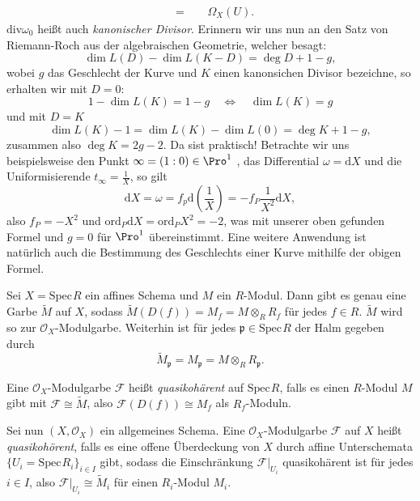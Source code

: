 \documentclass[11pt]{book}
\theoremstyle{nonumberbreak}
\newenvironment{ex}[1][]{\ifthenelse{\equal{#1}{}}{\example}{\example[#1]}\rm}{\endexample}
\newenvironment{definbem}[1][]{\ifthenelse{\equal{#1}{}}{\definibem}{\definibem[#1]}\rm}{\enddefinibem}
\newcommand{\spec}{\mathrm{Spec} \hspace{1pt} }
\newcommand{\p}{\mathfrak{p}}
\begin{document}
\begin{spacing}{1.4}
\begin{ex}
\begin{compactenum}
\begin{alignat*}{5}
&=&& \ \ \Omega_X(U).
\end{alignat*}
$\text{div} \omega_0$ heißt auch \textit{kanonischer Divisor}. Erinnern wir uns nun an den Satz von Riemann-Roch aus der algebraischen Geometrie, welcher besagt:
$$\dim L(D) - \dim L(K-D) = \deg D +1 - g,$$
wobei $g$ das Geschlecht der Kurve und $K$ einen kanonsichen Divisor bezeichne, so erhalten wir mit $D=0$:
$$1- \dim L(K) = 1-g \quad \Longleftrightarrow \quad \dim L(K) = g$$
und mit $D=K$
$$\dim L(K)-1 = \dim L(K) - \dim L(0) = \deg K +1 - g,$$
zusammen also
$\deg K = 2g-2$. Da sist praktisch! Betrachte wir uns beispielsweise den Punkt $\infty = (1:0) \in \Pro^1$ , das Differential $\omega = \mathrm{d}X$ und die Uniformisierende $t_{\infty} = \frac{1}{X}$, so gilt 
$$ \text{d}X =\omega= f_p \text{d}\left( \frac{1}{X}\right) = -f_P \frac{1}{X^2} \text{d}X,$$
also $f_P= -X^2$ und $\text{ord}_P \text{d}X = \text{ord}_P X^2 = -2$, was mit unserer oben gefunden Formel und $g=0$ für $\Pro^1$ übereinstimmt. Eine weitere Anwendung ist natürlich auch die Bestimmung des Geschlechts einer Kurve mithilfe der obigen Formel.

\end{compactenum}
\end{ex}


\begin{definbem}    %

\begin{compactenum}
\item Sei $X = \spec R$ ein affines Schema und $M$ ein $R$-Modul. Dann gibt es genau eine Garbe $\tilde{M}$ auf $X$, sodass $\tilde{M}(D(f)) = M_f = M \otimes_R R_f$ für jedes $f \in R$. $\tilde{M}$ wird so zur $\mathcal{O}_X$-Modulgarbe. Weiterhin ist für jedes $\p \in \spec R$ der Halm gegeben durch 
$$\tilde{M}_{\p} = M_{\p} = M \otimes_R R_{\p}.$$
\item Eine $\mathcal{O}_X$-Modulgarbe $\mathcal{F}$ heißt \textit{quasikohärent} auf $\spec R$, falls es einen $R$-Modul $M$ gibt mit $\mathcal{F} \cong \tilde{M}$, also $\mathcal{F}(D(f)) \cong M_f$ als $R_f$-Moduln.
\item Sei nun $(X, \mathcal{O}_X)$ ein allgemeines Schema. Eine $\mathcal{O}_X$-Modulgarbe $\mathcal{F}$ auf $X$ heißt \textit{quasikohörent}, falls es eine offene Überdeckung von $X$ durch affine Unterschemata $\{U_i= \spec R_i\}_{i \in I}$ gibt, sodass die Einschränkung $\mathcal{F}\vert_{U_i}$ quasikohärent ist für jedes $i \in I$, also $\mathcal{F}\vert_{U_i} \cong \tilde{M}_i$ für einen $R_i$-Modul $M_i$.


\end{compactenum}
\end{definbem}
\end{spacing}
\end{document}
